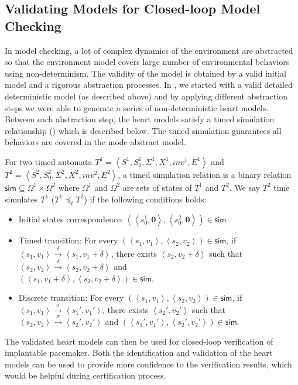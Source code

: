 \subsection{Validating Models for Closed-loop Model Checking}
In model checking, a lot of complex dynamics of the environment are abstracted so that the environment model covers large number of environmental behaviors using non-determinism. The validity of the model is obtained by a valid initial model and a rigorous abstraction processes. In \cite{STTT13}, we started with a valid detailed deterministic model (as described above) and by applying different abstraction steps we were able to generate a series of non-deterministic heart models. Between each abstraction step, the heart models satisfy a timed simulation relationship (\cite{simulation}) which is described below. The timed simulation guarantees all behaviors are covered in the mode abstract model.

For two timed automata $T^1=\left\langle S^1,S_0^1,\Sigma^1,X^1,inv^1,E^1\right\rangle$ and $T^2=\left\langle S^2,S_0^2,\Sigma^2,X^2,inv^2,E^2\right\rangle$, a timed simulation relation is a binary relation $\textsf{sim}\subseteq \Omega^1\times \Omega^2$ where $\Omega^1$ and $\Omega^2$ are sets of states of $T^1$ and $T^2$. We say $T^2$ \textsf{time simulates} $T^1$ ($T^1 \preceq_t T^2$) if the following conditions holds:
\begin{itemize}
	\item Initial states correspondence: $(\left\langle s_0^1,\textbf{0}\right\rangle,\left\langle s_0^2,\textbf{0}\right\rangle)\in \textsf{sim}$
	\item Timed transition: For every $(\left\langle s_1,v_1\right\rangle,\left\langle s_2,v_2\right\rangle)\in\textsf{sim}$, if $\left\langle s_1,v_1\right\rangle\xrightarrow{\delta}\left\langle s_1,v_1+\delta\right\rangle$, there exists $\left\langle s_2,v_2+\delta\right\rangle$ such that $\left\langle s_2,v_2\right\rangle\xrightarrow{\delta}\left\langle s_2,v_2+\delta\right\rangle$ and \\$(\left\langle s_1,v_1+\delta\right\rangle,\left\langle s_2,v_2+\delta\right\rangle)\in\textsf{sim}$.
	\item Discrete transition: For every $(\left\langle s_1,v_1\right\rangle,\left\langle s_2,v_2\right\rangle)\in\textsf{sim}$, if $\left\langle s_1,v_1\right\rangle\xrightarrow{\sigma}\left\langle s_1',v_1'\right\rangle$, there exists $\left\langle s_2',v_2'\right\rangle$ such that $\left\langle s_2,v_2\right\rangle\xrightarrow{\sigma}\left\langle s_2',v_2'\right\rangle$ and $(\left\langle s_1',v_1'\right\rangle,\left\langle s_2',v_2'\right\rangle)\in\textsf{sim}$.
\end{itemize}

The validated heart models can then be used for closed-loop verification of implantable pacemaker. Both the identification and validation of the heart models can be used to provide more confidence to the verification results, which would be helpful during certification process.
 